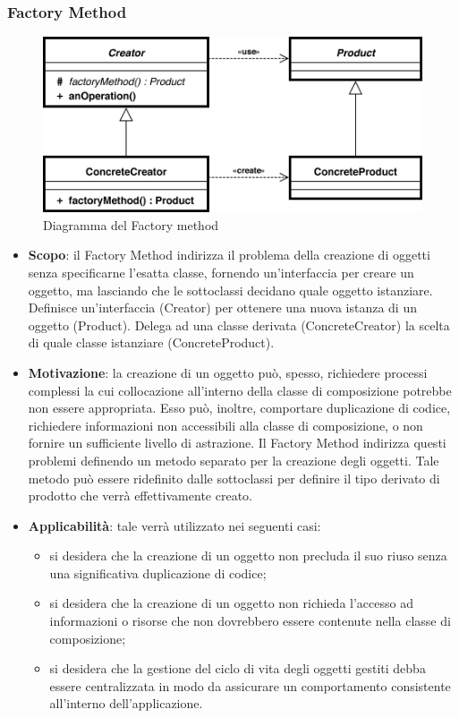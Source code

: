 		\subsubsection{Factory Method}
		\begin{figure}[H]
		\centering
		\includegraphics[width=0.5\linewidth]{GraficiAppendici/factory.png}
		\caption{Diagramma del  Factory method}
	\end{figure}
		\begin{itemize}
		\item \textbf{Scopo}: il  Factory Method indirizza il problema della creazione
di oggetti senza specificarne l’esatta classe, fornendo un’interfaccia per creare un oggetto, ma lasciando che le sottoclassi decidano quale oggetto istanziare. Definisce un’interfaccia (Creator) per ottenere una nuova istanza di un oggetto (Product). Delega ad una classe derivata (ConcreteCreator) la scelta di quale classe istanziare (ConcreteProduct).
		\item \textbf{Motivazione}: la creazione di un oggetto può, spesso, richiedere processi complessi la cui collocazione all’interno della classe di composizione potrebbe non essere appropriata. Esso può, inoltre, comportare duplicazione di codice, richiedere informazioni non accessibili alla classe di composizione, o non fornire un sufficiente livello di astrazione.
Il Factory Method indirizza questi problemi definendo un metodo separato per la creazione degli oggetti. Tale metodo può essere ridefinito dalle sottoclassi per definire il tipo derivato di prodotto che verrà effettivamente creato.
		\item \textbf{Applicabilità}: tale  verrà utilizzato nei seguenti casi:
		\begin{itemize}
		\item si desidera che la creazione di un oggetto non precluda il suo riuso senza una significativa duplicazione di codice;
		\item si desidera che la creazione di un oggetto non richieda l’accesso ad informazioni o risorse che non dovrebbero essere contenute nella classe di composizione;
		\item si desidera che la gestione del ciclo di vita degli oggetti gestiti debba essere centralizzata in modo da assicurare un comportamento consistente all’interno dell’applicazione.
		\end{itemize}
		\end{itemize}				
		
